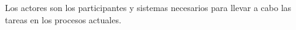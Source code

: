 %

Los actores son los participantes y sistemas necesarios para llevar a cabo las 
tareas en los procesos actuales.
